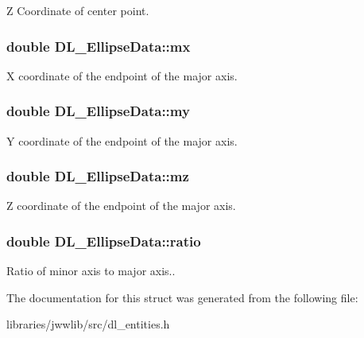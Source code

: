 Z Coordinate of center point. \hypertarget{structDL__EllipseData_affb164bd9bb3b2a6f6e82d4721e0d9d0}{
\subsubsection[{mx}]{\setlength{\rightskip}{0pt plus 5cm}double D\-L\-\_\-\-Ellipse\-Data\-::mx}}\label{structDL__EllipseData_affb164bd9bb3b2a6f6e82d4721e0d9d0}
X coordinate of the endpoint of the major axis. \hypertarget{structDL__EllipseData_a3a613784af502ed5ceff4826512728b8}{
\subsubsection[{my}]{\setlength{\rightskip}{0pt plus 5cm}double D\-L\-\_\-\-Ellipse\-Data\-::my}}\label{structDL__EllipseData_a3a613784af502ed5ceff4826512728b8}
Y coordinate of the endpoint of the major axis. \hypertarget{structDL__EllipseData_aa16a9677a0a87d1eb32f783aa50fa2f0}{
\subsubsection[{mz}]{\setlength{\rightskip}{0pt plus 5cm}double D\-L\-\_\-\-Ellipse\-Data\-::mz}}\label{structDL__EllipseData_aa16a9677a0a87d1eb32f783aa50fa2f0}
Z coordinate of the endpoint of the major axis. \hypertarget{structDL__EllipseData_a1743665331947c24bab27b38ace677fc}{
\subsubsection[{ratio}]{\setlength{\rightskip}{0pt plus 5cm}double D\-L\-\_\-\-Ellipse\-Data\-::ratio}}\label{structDL__EllipseData_a1743665331947c24bab27b38ace677fc}
Ratio of minor axis to major axis.. 

The documentation for this struct was generated from the following file\-:\begin{DoxyCompactItemize}
\item 
libraries/jwwlib/src/dl\-\_\-entities.\-h\end{DoxyCompactItemize}
